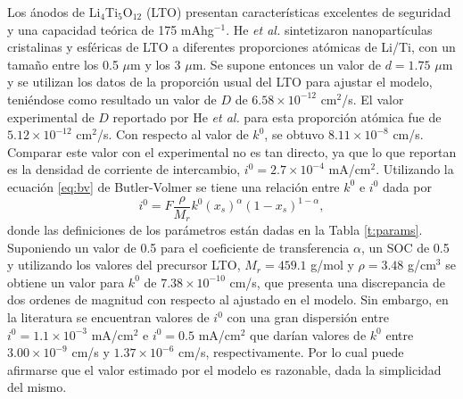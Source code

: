 Los ánodos de Li$_4$Ti$_5$O$_{12}$ (LTO) presentan características excelentes
de seguridad y una capacidad teórica de 175 mAhg$^{-1}$. He \textit{et al.} 
\cite{he2012} sintetizaron nanopartículas cristalinas y esféricas de LTO a 
diferentes proporciones atómicas de Li/Ti, con un tamaño entre los 0.5 $\mu$m 
y los 3 $\mu$m. Se supone entonces un valor de $d=1.75$ $\mu$m y se utilizan los
datos de la proporción usual del LTO para ajustar el modelo, teniéndose como 
resultado un valor de $D$ de $6.58\times10^{-12}$ cm$^2$/s. El valor experimental 
de $D$ reportado por He \textit{et al.} para esta proporción atómica fue de
$5.12\times10^{-12}$ cm$^2$/s. Con respecto al valor de $k^0$, se obtuvo 
$8.11\times10^{-8}$ cm/s. Comparar este valor con el experimental no es tan 
directo, ya que lo que reportan es la densidad de corriente de intercambio, 
$i^0 = 2.7\times10^{-4}$ mA/cm$^2$. Utilizando la ecuación \ref{eq:bv} de 
Butler-Volmer se tiene una relación entre $k^0$ e $i^0$ dada por
\begin{equation}\label{eq:i0k0}
    i^0 = F \frac{\rho}{M_r} k^0 \left(x_s\right)^{\alpha} \left(1 - x_s\right)^{1-\alpha},
\end{equation}
donde las definiciones de los parámetros están dadas en la Tabla \ref{t:params}.
Suponiendo un valor de 0.5 para el coeficiente de transferencia $\alpha$, un 
SOC de 0.5 y utilizando los valores del precursor LTO, $M_r = 459.1$ g/mol y
$\rho = 3.48$ g/cm$^3$ \cite{osti_1284125} se obtiene un valor para $k^0$ de
$7.38\times10^{-10}$ cm/s, que presenta una discrepancia de dos ordenes de 
magnitud con respecto al ajustado en el modelo. Sin embargo, en la literatura
se encuentran valores de $i^0$ con una gran dispersión entre 
$i^0 = 1.1\times10^{-3}$ mA/cm$^2$ \cite{medina2015} e $i^0 = 0.5$ mA/cm$^2$ 
\cite{umirov2019} que darían valores de $k^0$ entre $3.00\times10^{-9}$ cm/s y 
$1.37\times10^{-6}$ cm/s, respectivamente. Por lo cual puede afirmarse que el 
valor estimado por el modelo es razonable, dada la simplicidad del mismo.

